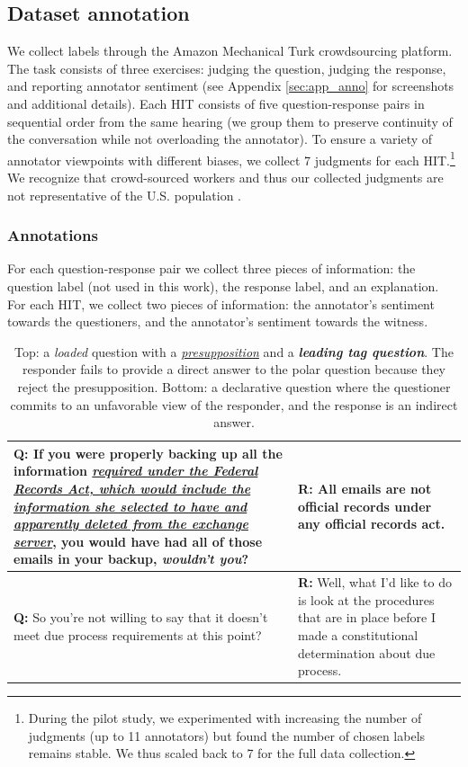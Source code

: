 \subsection{Dataset annotation} 
\label{sec:subj_annotations}
We collect labels through the Amazon Mechanical Turk crowdsourcing platform. The task consists of three exercises: judging the question, judging the response, and reporting annotator sentiment (see Appendix \ref{sec:app_anno} for screenshots and additional details). Each HIT consists of five question-response pairs in sequential order from the same hearing (we group them to preserve continuity of the conversation while not overloading the annotator). To ensure a variety of annotator viewpoints with different biases, we collect 7 judgments for each HIT.\footnote{During the pilot study, we experimented with increasing the number of judgments (up to 11 annotators) but found the number of chosen labels remains stable. We thus scaled back to 7 for the full data collection.} We recognize that crowd-sourced workers and thus our collected judgments are not representative of the U.S. population \cite{Difallah:2018}. 

\subsubsection{Annotations}
For each question-response pair we collect three pieces of information: the question label (not used in this work), the response label, and an explanation. For each HIT, we collect two pieces of information: the annotator's sentiment towards the questioners, and the annotator's sentiment towards the witness.

\begin{table}[]
\small
    \centering
    \begin{tabular}{>{\raggedright\arraybackslash}p{6.2cm} >{\raggedright\arraybackslash}p{4.2cm}}
    \toprule
\textbf{Q: } If you were properly backing up all the information \textit{\uline{required under the Federal Records Act, which would include the information she selected to have and apparently deleted from the exchange server}}, you would have had all of those emails in your backup, \textit{\textbf{wouldn't you}}? & \textbf{R: } All emails are not official records under any official records act.\\
\midrule
\textbf{Q: }So you're not willing to say that it doesn't meet due process requirements at this point? & \textbf{R: } 
Well, what I'd like to do is look at the procedures that are in place before I made a constitutional determination about due process.\\
\bottomrule
    \end{tabular}
    \vspace{-.5em}
    \caption{Top: a \emph{loaded} question with a \uline{\textit{presupposition}} and a \textbf{\textit{leading tag question}}. The responder fails to provide a direct answer to the polar question because they reject the presupposition. Bottom: a declarative question where the questioner commits to an unfavorable view of the responder, and the response is an indirect answer.}
    \label{tab:subj_questions}
\end{table}

